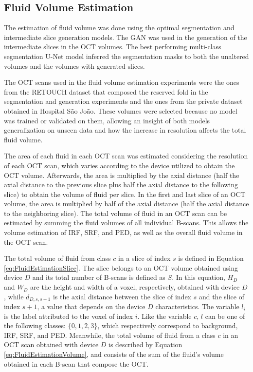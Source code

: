 \subsection{Fluid Volume Estimation}
The estimation of fluid volume was done using the optimal segmentation and intermediate slice generation models. The GAN was used in the generation of the intermediate slices in the OCT volumes. The best performing multi-class segmentation  U-Net model inferred the segmentation masks to both the unaltered volumes and the volumes with generated slices. 
\par
The OCT scans used in the fluid volume estimation experiments were the ones from the RETOUCH dataset that composed the reserved fold in the segmentation and generation experiments and the ones from the private dataset obtained in Hospital São João. These volumes were selected because no model was trained or validated on them, allowing an insight of both models generalization on unseen data and how the increase in resolution affects the total fluid volume.
\par
The area of each fluid in each OCT scan was estimated considering the resolution of each OCT scan, which varies according to the device utilized to obtain the OCT volume. Afterwards, the area is multiplied by the axial distance (half the axial distance to the previous slice plus half the axial distance to the following slice) to obtain the volume of fluid per slice. In the first and last slice of an OCT volume, the area is multiplied by half of the axial distance (half the axial distance to the neighboring slice). The total volume of fluid in an OCT scan can be estimated by summing the fluid volumes of all individual B-scans. This allows the volume estimation of IRF, SRF, and PED, as well as the overall fluid volume in the OCT scan.
\par
The total volume of fluid from class $c$ in a slice of index $s$ is defined in Equation \ref{eq:FluidEstimationSlice}. The slice belongs to an OCT volume obtained using device $D$ and its total number of B-scans is defined as $S$. In this equation, $H_{D}$ and $W_{D}$ are the height and width of a voxel, respectively, obtained with device $D$, while $d_{D,s,s+1}$ is the axial distance between the slice of index $s$ and the slice of index $s+1$, a value that depends on the device $D$ characteristics. The variable $l_{i}$ is the label attributed to the voxel of index $i$. Like the variable $c$, $l$ can be one of the following classes: $\{0,1,2,3\}$, which respectively correspond to background, IRF, SRF, and PED. Meanwhile, the total volume of fluid from a class $c$ in an OCT scan obtained with device $D$ is described by Equation \ref{eq:FluidEstimationVolume}, and consists of the sum of the fluid's volume obtained in each B-scan that compose the OCT.

